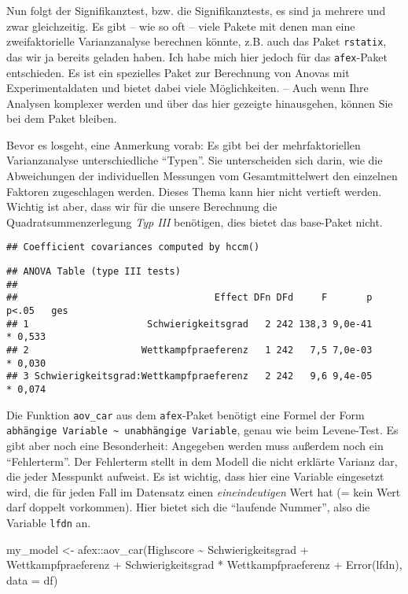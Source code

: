 \documentclass[
]{book}
\newenvironment{Shaded}{\begin{snugshade}}{\end{snugshade}}
\newcommand{\AttributeTok}[1]{\textcolor[rgb]{0.77,0.63,0.00}{#1}}
\newcommand{\FunctionTok}[1]{\textcolor[rgb]{0.00,0.00,0.00}{#1}}
\newcommand{\NormalTok}[1]{#1}
\newcommand{\OtherTok}[1]{\textcolor[rgb]{0.56,0.35,0.01}{#1}}
\newcommand{\SpecialCharTok}[1]{\textcolor[rgb]{0.00,0.00,0.00}{#1}}
\begin{document}
Nun folgt der Signifikanztest, bzw. die Signifikanztests, es sind ja mehrere und zwar gleichzeitig. Es gibt -- wie so oft -- viele Pakete mit denen man eine zweifaktorielle Varianzanalyse berechnen könnte, z.B. auch das Paket \texttt{rstatix}, das wir ja bereits geladen haben. Ich habe mich hier jedoch für das \texttt{afex}-Paket entschieden. Es ist ein spezielles Paket zur Berechnung von Anovas mit Experimentaldaten und bietet dabei viele Möglichkeiten. -- Auch wenn Ihre Analysen komplexer werden und über das hier gezeigte hinausgehen, können Sie bei dem Paket bleiben.

Bevor es losgeht, eine Anmerkung vorab: Es gibt bei der mehrfaktoriellen Varianzanalyse unterschiedliche ``Typen''. Sie unterscheiden sich darin, wie die Abweichungen der individuellen Messungen vom Gesamtmittelwert den einzelnen Faktoren zugeschlagen werden. Dieses Thema kann hier nicht vertieft werden. Wichtig ist aber, dass wir für die unsere Berechnung die Quadratsummenzerlegung \emph{Typ III} benötigen, dies bietet das base-Paket nicht.

\begin{verbatim}
## Coefficient covariances computed by hccm()
\end{verbatim}

\begin{verbatim}
## ANOVA Table (type III tests)
## 
##                                   Effect DFn DFd     F       p p<.05   ges
## 1                     Schwierigkeitsgrad   2 242 138,3 9,0e-41     * 0,533
## 2                    Wettkampfpraeferenz   1 242   7,5 7,0e-03     * 0,030
## 3 Schwierigkeitsgrad:Wettkampfpraeferenz   2 242   9,6 9,4e-05     * 0,074
\end{verbatim}

Die Funktion \texttt{aov\_car} aus dem \texttt{afex}-Paket benötigt eine Formel der Form \texttt{abhängige\ Variable\ \textasciitilde{}\ unabhängige\ Variable}, genau wie beim Levene-Test. Es gibt aber noch eine Besonderheit: Angegeben werden muss außerdem noch ein ``Fehlerterm''. Der Fehlerterm stellt in dem Modell die nicht erklärte Varianz dar, die jeder Messpunkt aufweist. Es ist wichtig, dass hier eine Variable eingesetzt wird, die für jeden Fall im Datensatz einen \emph{eineindeutigen} Wert hat (= kein Wert darf doppelt vorkommen). Hier bietet sich die ``laufende Nummer'', also die Variable \texttt{lfdn} an.

\begin{Shaded}
\begin{Highlighting}[]
\NormalTok{my\_model }\OtherTok{\textless{}{-}}\NormalTok{ afex}\SpecialCharTok{::}\FunctionTok{aov\_car}\NormalTok{(Highscore }\SpecialCharTok{\textasciitilde{}}\NormalTok{ Schwierigkeitsgrad }\SpecialCharTok{+}\NormalTok{ Wettkampfpraeferenz }\SpecialCharTok{+} 
\NormalTok{                                      Schwierigkeitsgrad }\SpecialCharTok{*}\NormalTok{ Wettkampfpraeferenz }\SpecialCharTok{+}
                                      \FunctionTok{Error}\NormalTok{(lfdn), }
                          \AttributeTok{data =}\NormalTok{ df)}
\end{Highlighting}
\end{Shaded}
\end{document}
